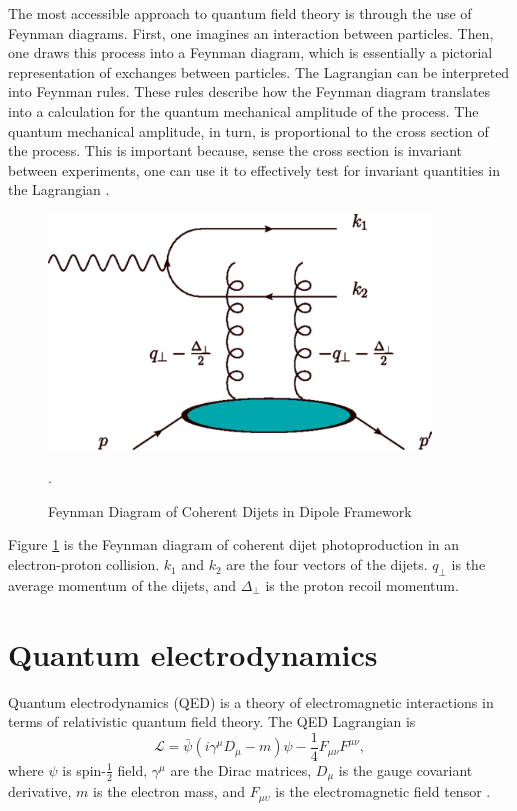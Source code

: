 The most accessible approach to quantum field theory is through the use of Feynman diagrams. First, one imagines an interaction between particles. Then, one draws this process into a Feynman diagram, which is essentially a pictorial representation of exchanges between particles. The Lagrangian can be interpreted into Feynman rules. These rules describe how the Feynman diagram translates into a calculation for the quantum mechanical amplitude of the process. The quantum mechanical amplitude, in turn, is proportional to the cross section of the process. This is important because, sense the cross section is invariant between experiments, one can use it to effectively test for invariant quantities in the Lagrangian \cite{Peskin:1995ev}. 

\begin{figure}[h!]
\begin{centering}
\includegraphics[width=4in]{Chapter1/importfigs/fig4_yatta.png}
\par\end{centering}
\caption{Feynman Diagram of Coherent Dijets in Dipole Framework \cite{Hatta:2016dxp}\label{fig:yatta1}}.
\end{figure}

Figure \ref{fig:yatta1} is the Feynman diagram of coherent dijet photoproduction in an electron-proton collision. $k_1$ and $k_2$ are the four vectors of the dijets. $q_\perp$ is the average momentum of the dijets, and $\Delta_\perp$ is the proton recoil momentum. 

\section{Quantum electrodynamics}

Quantum electrodynamics (QED) is a theory of electromagnetic interactions in terms of relativistic quantum field theory. The QED Lagrangian is
\begin{equation}
{\mathcal {L}}={\bar {\psi }}(i\gamma ^{\mu }D_{\mu }-m)\psi -{\frac {1}{4}}F_{\mu \nu }F^{\mu \nu },
\end{equation} 
where $\psi$ is spin-$\frac{1}{2}$ field, $\gamma^\mu$ are the Dirac matrices, $D_\mu$ is the gauge covariant derivative, $m$ is the electron mass, and $F_{\mu\upsilon}$ is the electromagnetic field tensor \cite{Peskin:1995ev}.

